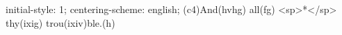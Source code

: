 initial-style: 1;
centering-scheme: english;
(c4)And(hvhg) all(fg) <sp>*</sp> thy(ixig) trou(ixiv)ble.(h)
